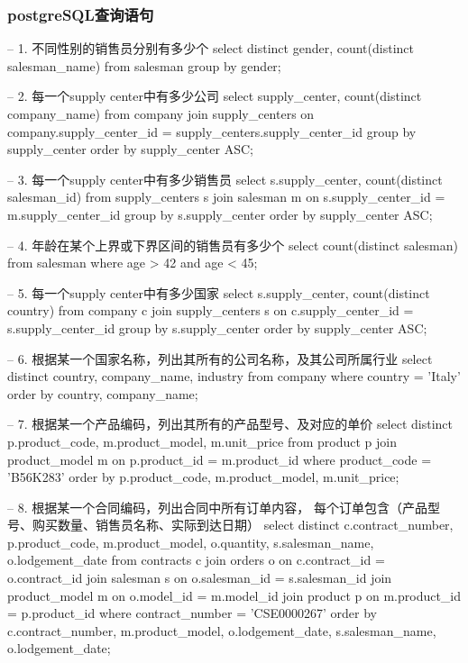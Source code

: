 \documentclass[11pt]{article}
\begin{document}
\subsubsection{postgreSQL查询语句}
\begin{commandline}
-- 1. 不同性别的销售员分别有多少个
select distinct gender, count(distinct salesman_name)
from salesman
group by gender;

-- 2. 每一个supply center中有多少公司
select supply_center, count(distinct company_name)
from company
         join supply_centers on company.supply_center_id = supply_centers.supply_center_id
group by supply_center
order by supply_center ASC;

-- 3. 每一个supply center中有多少销售员
select s.supply_center, count(distinct salesman_id)
from supply_centers s
         join salesman m on s.supply_center_id = m.supply_center_id
group by s.supply_center
order by supply_center ASC;

-- 4. 年龄在某个上界或下界区间的销售员有多少个
select count(distinct salesman)
from salesman
where age > 42 and age < 45;

-- 5. 每一个supply center中有多少国家
select s.supply_center, count(distinct country)
from company c
         join supply_centers s on c.supply_center_id = s.supply_center_id
group by s.supply_center
order by supply_center ASC;

-- 6. 根据某一个国家名称，列出其所有的公司名称，及其公司所属行业
select distinct country, company_name, industry
from company
where country = 'Italy'
order by country, company_name;

-- 7. 根据某一个产品编码，列出其所有的产品型号、及对应的单价
select distinct p.product_code, m.product_model, m.unit_price
from product p
         join product_model m on p.product_id = m.product_id
where product_code = 'B56K283'
order by p.product_code, m.product_model, m.unit_price;

-- 8. 根据某一个合同编码，列出合同中所有订单内容，
每个订单包含（产品型号、购买数量、销售员名称、实际到达日期）
select distinct c.contract_number, p.product_code, m.product_model, o.quantity, s.salesman_name, o.lodgement_date
from contracts c
         join orders o on c.contract_id = o.contract_id
         join salesman s on o.salesman_id = s.salesman_id
         join product_model m on o.model_id = m.model_id
         join product p on m.product_id = p.product_id
where contract_number = 'CSE0000267'
order by c.contract_number, m.product_model, o.lodgement_date, s.salesman_name, o.lodgement_date;

\end{commandline}
\end{document}
